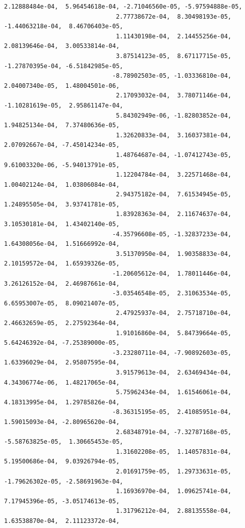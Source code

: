 \documentclass[11pt]{article}
\begin{document}
\begin{Verbatim}[commandchars=\\\{\}]
                               2.12888484e-04,  5.96454618e-04, -2.71046560e-05, -5.97594888e-05,
                               2.77738672e-04,  8.30498193e-05, -1.44063218e-04,  8.46706403e-05,
                               1.11430198e-04,  2.14455256e-04,  2.08139646e-04,  3.00533814e-04,
                               3.87514123e-05,  8.67117715e-05, -1.27870395e-04, -6.51842985e-05,
                              -8.78902503e-05, -1.03336810e-04,  2.04007340e-05,  1.48004501e-06,
                               2.17093032e-04,  3.78071146e-04, -1.10281619e-05,  2.95861147e-04,
                               5.84302949e-06, -1.82803852e-04,  1.94825134e-04,  7.37480636e-05,
                               1.32620833e-04,  3.16037381e-04,  2.07092667e-04, -7.45014234e-05,
                               1.48764687e-04, -1.07412743e-05,  9.61003320e-06, -5.94013791e-05,
                               1.12204784e-04,  3.22571468e-04,  1.00402124e-04,  1.03806084e-04,
                               2.94375182e-04,  7.61534945e-05,  1.24895505e-04,  3.93741781e-05,
                               1.83928363e-04,  2.11674637e-04,  3.10530181e-04,  1.43402140e-05,
                              -4.35796608e-05, -1.32837233e-04,  1.64308056e-04,  1.51666992e-04,
                               3.51370950e-04,  1.90358833e-04,  2.10159572e-04,  1.65939326e-05,
                              -1.20605612e-04,  1.78011446e-04,  3.26126152e-04,  2.46987661e-04,
                              -3.03546548e-05,  2.31063534e-05,  6.65953007e-05,  8.09021407e-05,
                               2.47925937e-04,  2.75718710e-04,  2.46632659e-05,  2.27592364e-04,
                               1.91016860e-04,  5.84739664e-05,  5.64246392e-04, -7.25389000e-05,
                              -3.23280711e-04, -7.90892603e-05,  1.63396029e-04,  2.95807595e-04,
                               3.91579613e-04,  2.63469434e-04,  4.34306774e-06,  1.48217065e-04,
                               5.75962434e-04,  1.61546061e-04,  4.18313995e-04,  1.29785826e-04,
                              -8.36315195e-05,  2.41085951e-04,  1.59015093e-04, -2.80965620e-04,
                               2.68348791e-04, -7.32787168e-05, -5.58763825e-05,  1.30665453e-05,
                               1.31602208e-05,  1.14057831e-04,  5.19500686e-04,  9.03926794e-05,
                               2.01691759e-05,  1.29733631e-05, -1.79626302e-05, -2.58691963e-04,
                               1.16936970e-04,  1.09625741e-04,  7.17945396e-05, -3.05174613e-05,
                               1.31796212e-04,  2.88135558e-04,  1.63538870e-04,  2.11123372e-04,

\end{Verbatim}
\end{document}
